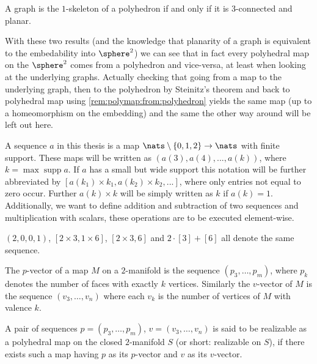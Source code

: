 \begin{theorem} A graph is the $1$-skeleton of a polyhedron if and only if it is $3$-connected and planar.
\end{theorem}

With these two results (and the knowledge that planarity of a graph is equivalent to the embedability into $\sphere^2$) we can see that in fact every polyhedral map on the $\sphere^2$ comes from a polyhedron and vice-versa, at least when looking at the underlying graphs. Actually checking that going from a map to the underlying graph, then to the polyhedron by {\sc Steinitz's} theorem and back to polyhedral map using \autoref{rem:polymap:from:polyhedron} yields the same map (up to a homeomorphism on the embedding) and the same the other way around will be left out here.

\begin{definition}[Sequence]
  A sequence $a$ in this thesis is a map $\nats \setminus \{0, 1, 2\} \rightarrow \nats$ with finite support. These maps will be written as $(a(3), a(4), ..., a(k))$, where $k = \operatorname{max} \operatorname{supp} a$. If $a$ has a small but wide support this notation will be further abbreviated by $[a(k_1) \times k_1, a(k_2) \times k_2, ...]$, where only entries not equal to zero occur. Further $a(k) \times k$ will be simply written as $k$ if $a(k) = 1$. Additionally, we want to define addition and subtraction of two sequences and multiplication with scalars, these operations are to be executed element-wise.
\end{definition}
\begin{example}
  $(2, 0, 0, 1)$, $[2 \times 3, 1 \times 6]$, $[2 \times 3, 6]$ and $2 \cdot [3] + [6]$ all denote the same sequence.
\end{example}
\begin{definition}\label{def:relizable}
  The $p$-vector of a map $M$ on a $2$-manifold is the sequence $(p_3, \dots, p_m)$, where $p_k$ denotes the number of faces with exactly $k$ vertices. Similarly the $v$-vector of $M$ is the sequence $(v_3, \dots, v_n)$ where each $v_k$ is the number of vertices of $M$ with valence $k$.
\end{definition}

\begin{definition}\label{def:realizable}
  A pair of sequences $p = (p_3, \dots, p_m)$, $v = (v_3, \dots, v_n)$ is said to be realizable as a polyhedral map on the closed $2$-manifold $S$ (or short: realizable on $S$), if there exists such a map having $p$ as its $p$-vector and $v$ as its $v$-vector.
\end{definition}

